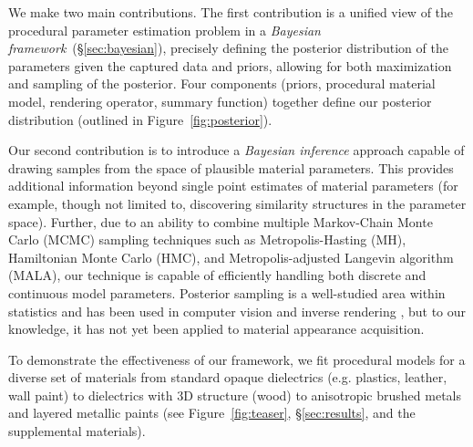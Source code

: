 We make two main contributions. The first contribution is a unified view of the procedural parameter estimation problem in a \emph{Bayesian framework}~(\S\ref{sec:bayesian}), precisely defining the posterior distribution of the parameters given the captured data and priors, allowing for both maximization and sampling of the posterior. Four components (priors, procedural material model, rendering operator, summary function) together define our posterior distribution (outlined in Figure~\ref{fig:posterior}). %

Our second contribution is to introduce a \emph{Bayesian inference} approach capable of drawing samples from the space of plausible material parameters.
This provides additional information beyond single point estimates of material parameters (for example, though not limited to, discovering similarity structures in the parameter space).
Further, due to an ability to combine multiple Markov-Chain Monte Carlo (MCMC) sampling techniques such as Metropolis-Hasting (MH), Hamiltonian Monte Carlo (HMC), and Metropolis-adjusted Langevin algorithm (MALA), our technique is capable of efficiently handling both discrete and continuous model parameters.
Posterior sampling is a well-studied area within statistics and has been used in computer vision and inverse rendering \cite{Picture}, but to our knowledge, it has not yet been applied to material appearance acquisition.

To demonstrate the effectiveness of our framework, we fit procedural models for a diverse set of materials from standard opaque dielectrics (e.g. plastics, leather, wall paint) to dielectrics with 3D structure (wood) to anisotropic brushed metals and layered metallic paints (see Figure~\ref{fig:teaser}, \S\ref{sec:results}, and the supplemental materials).



